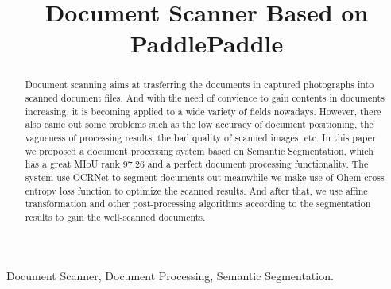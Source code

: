 \documentclass[10pt, conference, compsocconf]{IEEEtran}
\begin{document}
	\title{Document Scanner Based on PaddlePaddle}
	
	\author{
		}
	\maketitle
	\begin{abstract}
		
	Document scanning aims at trasferring the documents in captured photographs into scanned document files. 
	And with the need of convience to gain contents in documents increasing, it is becoming applied to a wide variety of fields nowadays. 
	However, there also came out some problems such as the low accuracy of document positioning, the vagueness of processing results, the bad quality of scanned images, etc. 
	In this paper we proposed a document processing system based on Semantic Segmentation, which has a great MIoU rank 97.26 and a perfect document processing functionality. 
	The system use OCRNet to segment documents out meanwhile we make use of Ohem cross entropy loss function to optimize the scanned results. 
	And after that, we use affine transformation and other post-processing algorithms according to the segmentation results to gain the well-scanned documents.
	\end{abstract}
	
	\begin{IEEEkeywords}
		
		Document Scanner, Document Processing, Semantic Segmentation.
		
	\end{IEEEkeywords}
	
	\IEEEpeerreviewmaketitle
	
\end{document}
